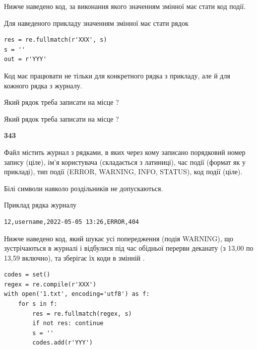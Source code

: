 Нижче наведено код, за виконання якого значенням змінної  має стати код події.

Для наведеного прикладу значенням змінної  має стати рядок 



\begin{verbatim}
res = re.fullmatch(r'XXX', s)
s = ''
out = r'YYY'
\end{verbatim}


Код має працювати не тільки для конкретного рядка з прикладу, але й для кожного рядка з журналу.




Який рядок треба записати на місце  ?\par
\vspace{5mm}


Який рядок треба записати на місце  ?\par


\newpage

{\begin {center}\textbf{ 343}\end {center}}\par
Файл  містить журнал з рядками, в яких через кому записано поряд\-ко\-вий номер запису (ціле), ім'я користувача (складається з латиниці), час події (фор\-мат як у прикладі), тип події (ERROR, WARNING, INFO, STATUS), код події (ціле).

Білі символи навколо роздільників не допускаються.

Приклад рядка журналу



\begin{verbatim}
12,username,2022-05-05 13:26,ERROR,404
\end{verbatim}


Нижче наведено код, який шукає усі попередження (подія WARNING), що зустрі\-ча\-ються в журналі і відбулися під час обідньої перерви деканату (з 13,00 по 13,59 включно), та зберігає їх коди в змінній .



\begin{verbatim}
codes = set()
regex = re.compile(r'XXX')
with open('1.txt', encoding='utf8') as f:
    for s in f:
        res = re.fullmatch(regex, s)
        if not res: continue
        s = ''
        codes.add(r'YYY')
\end{verbatim}







